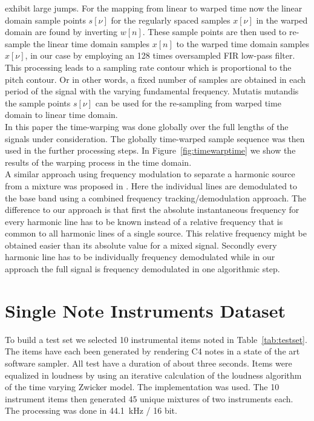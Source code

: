 exhibit large jumps.
For the mapping from linear to warped time now the linear domain sample points
$s[\nu]$ for the regularly spaced samples $x[\nu]$ in the warped domain are
found by inverting $w[n]$. These sample points are then used to re-sample the linear time
domain samples $x[n]$ to the warped time domain samples $x[\nu]$, in our case
by employing an 128 times oversampled FIR low-pass filter. This processing leads to a sampling rate contour which is proportional to the pitch contour. Or in other words, a fixed number of samples are obtained in each period of the signal with the varying fundamental frequency. Mutatis mutandis the sample points $s[\nu]$ can be used for the re-sampling from warped time domain to linear time
domain. \\

In this paper the time-warping was done globally over the full lengths of the
signals under consideration. The globally time-warped sample sequence
was then used in the further processing steps. In Figure~\ref{fig:timewarptime} we show the results of the warping process in the time domain. \\

A similar approach using frequency modulation to separate a harmonic
source from a mixture was proposed in \cite{wang1995instantaneous}. Here the
individual lines are demodulated to the base band using a combined frequency
tracking/demodulation approach. The difference to our approach is that first
the absolute instantaneous frequency for every harmonic line has to be known
instead of a relative frequency that is common to all harmonic lines of a single
source. This relative frequency might be obtained easier than its
absolute value for a mixed signal. Secondly every harmonic line has to be individually
frequency demodulated while in our approach the full signal is frequency demodulated in one algorithmic step.\\

\section{Single Note Instruments Dataset} %
\label{sub:test_set}

To build a test set we selected 10 instrumental items noted in Table~\ref{tab:testset}. The items have each been generated by rendering C4 notes in a state of the art software sampler. All test have a duration of about three seconds. Items were equalized in loudness by using an iterative calculation of the loudness algorithm of the time varying Zwicker model. The implementation \cite{genesis} was used. The 10 instrument items then generated 45 unique mixtures of two instruments each. The processing was done in 44.1~kHz / 16 bit.

